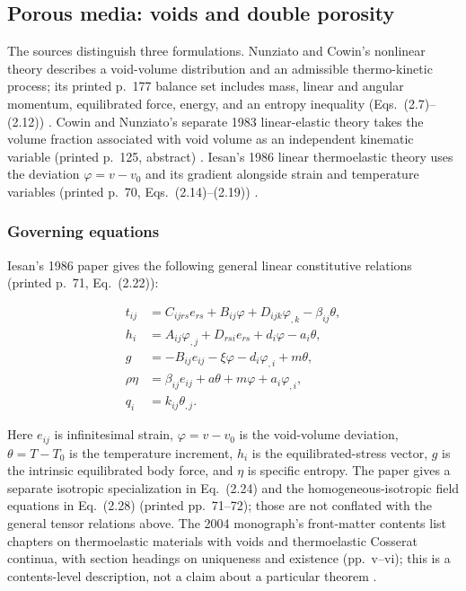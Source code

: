 \subsection{Porous media: voids and double porosity}
\label{sec:5.4}

The sources distinguish three formulations. Nunziato and Cowin's nonlinear theory describes a void-volume distribution and an admissible thermo-kinetic process; its printed p.~177 balance set includes mass, linear and angular momentum, equilibrated force, energy, and an entropy inequality (Eqs.~(2.7)--(2.12)) \cite{Nunziato1979}. Cowin and Nunziato's separate 1983 linear-elastic theory takes the volume fraction associated with void volume as an independent kinematic variable (printed p.~125, abstract) \cite{Cowin1983}. Iesan's 1986 linear thermoelastic theory uses the deviation $\varphi=v-v_0$ and its gradient alongside strain and temperature variables (printed p.~70, Eqs.~(2.14)--(2.19)) \cite{Iesan1986}.

\subsubsection{Governing equations}

Iesan's 1986 paper gives the following general linear constitutive relations (printed p.~71, Eq.~(2.22)):

\begin{equation}
\begin{aligned}
t_{ij} &= C_{ijrs}e_{rs} + B_{ij}\varphi + D_{ijk}\varphi_{,k} - \beta_{ij}\theta,\\
h_i &= A_{ij}\varphi_{,j} + D_{rsi}e_{rs} + d_i\varphi - a_i\theta,\\
g &= -B_{ij}e_{ij} - \xi\varphi - d_i\varphi_{,i} + m\theta,\\
\rho\eta &= \beta_{ij}e_{ij} + a\theta + m\varphi + a_i\varphi_{,i},\\
q_i &= k_{ij}\theta_{,j}.
\end{aligned}
\label{eq:5.14}
\end{equation}

Here $e_{ij}$ is infinitesimal strain, $\varphi=v-v_0$ is the void-volume deviation, $\theta=T-T_0$ is the temperature increment, $h_i$ is the equilibrated-stress vector, $g$ is the intrinsic equilibrated body force, and $\eta$ is specific entropy. The paper gives a separate isotropic specialization in Eq.~(2.24) and the homogeneous-isotropic field equations in Eq.~(2.28) (printed pp.~71--72); those are not conflated with the general tensor relations above. The 2004 monograph's front-matter contents list chapters on thermoelastic materials with voids and thermoelastic Cosserat continua, with section headings on uniqueness and existence (pp.~v--vi); this is a contents-level description, not a claim about a particular theorem \cite{Iesan2004}.

